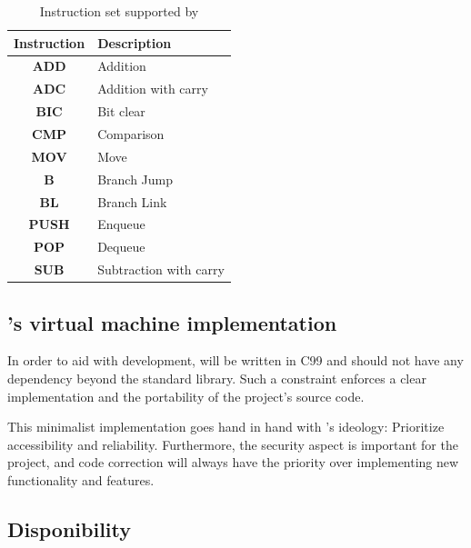 \documentclass[11pt,twoside]{article}
\begin{document}
\begin{table}
  \begin{centering}
    \begin{tabular}{|c|l|}
      \hline
      \textbf{Instruction} & \textbf{Description}   \\
      \hline
      \hline
      \textbf{ADD}         & Addition               \\
      \hline
      \textbf{ADC}         & Addition with carry    \\
      \hline
      \textbf{BIC}         & Bit clear              \\
      \hline
      \textbf{CMP}         & Comparison             \\
      \hline
      \textbf{MOV}         & Move                   \\
      \hline
      \textbf{B}           & Branch Jump            \\
      \hline
      \textbf{BL}          & Branch Link            \\
      \hline
      \textbf{PUSH}        & Enqueue                \\
      \hline
      \textbf{POP}         & Dequeue                \\
      \hline
      \textbf{SUB}         & Subtraction with carry \\
      \hline
    \end{tabular}
  \end{centering}
  \caption{Instruction set supported by }
  \label{tab:instructions}
\end{table}

\subsection{'s virtual machine implementation}

In order to aid with development,  will be written in C99 and should not have any dependency beyond the standard library. Such a constraint enforces a clear implementation and the portability of the project's source code.

This minimalist implementation goes hand in hand with 's ideology: Prioritize accessibility and reliability. Furthermore, the security aspect is important for the project, and code correction will always have the priority over implementing new functionality and features.

\subsection{Disponibility}
\end{document}
